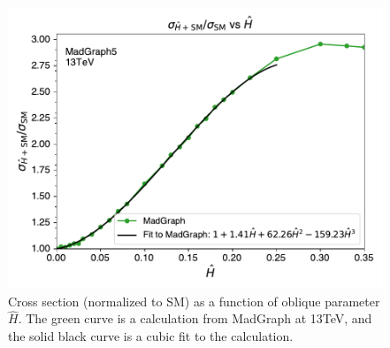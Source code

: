 \begin{figure}[!htbp]
    \centering
    \includegraphics[width=0.75\linewidth]{figs/ftan/higgs_oblique.pdf}
    \caption{
        Cross section (normalized to SM) as a function of oblique parameter $\hat{H}$.
        The green curve is a calculation from MadGraph at 13TeV, and
        the solid black curve is a cubic fit to the calculation.
    }
    \label{fig:higgs_oblique_madgraph}
\end{figure}